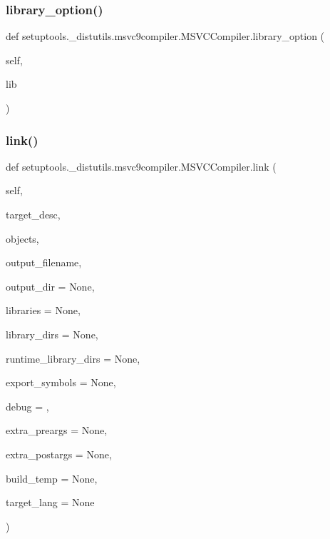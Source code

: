 \subsubsection{\texorpdfstring{library\+\_\+option()}{library\_option()}}
{\footnotesize\ttfamily def setuptools.\+\_\+distutils.\+msvc9compiler.\+M\+S\+V\+C\+Compiler.\+library\+\_\+option (\begin{DoxyParamCaption}\item[{}]{self,  }\item[{}]{lib }\end{DoxyParamCaption})}

\mbox{\label{classsetuptools_1_1__distutils_1_1msvc9compiler_1_1MSVCCompiler_a992df14bc1ce0871e1c9cc88ec17355d}} 
\subsubsection{\texorpdfstring{link()}{link()}}
{\footnotesize\ttfamily def setuptools.\+\_\+distutils.\+msvc9compiler.\+M\+S\+V\+C\+Compiler.\+link (\begin{DoxyParamCaption}\item[{}]{self,  }\item[{}]{target\+\_\+desc,  }\item[{}]{objects,  }\item[{}]{output\+\_\+filename,  }\item[{}]{output\+\_\+dir = {\ttfamily None},  }\item[{}]{libraries = {\ttfamily None},  }\item[{}]{library\+\_\+dirs = {\ttfamily None},  }\item[{}]{runtime\+\_\+library\+\_\+dirs = {\ttfamily None},  }\item[{}]{export\+\_\+symbols = {\ttfamily None},  }\item[{}]{debug = {},  }\item[{}]{extra\+\_\+preargs = {\ttfamily None},  }\item[{}]{extra\+\_\+postargs = {\ttfamily None},  }\item[{}]{build\+\_\+temp = {\ttfamily None},  }\item[{}]{target\+\_\+lang = {\ttfamily None} }\end{DoxyParamCaption})}


